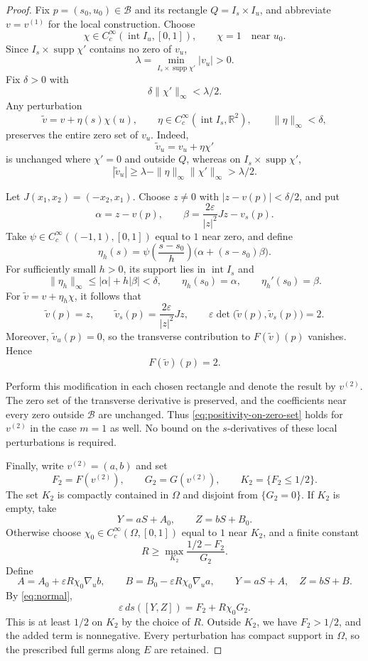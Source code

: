 \documentclass[11pt]{article}
\theoremstyle{remark}
\begin{document}
\begin{proof}
Fix $p=(s_0,u_0)\in\mathcal B$ and its rectangle $Q=I_s\times I_u$, and abbreviate $v=v^{(1)}$ for the local construction. Choose
$$
  \chi\in C_c^\infty(\operatorname{int}I_u,[0,1]),
  \qquad
  \chi=1\quad\text{near }u_0.
$$
Since $I_s\times\operatorname{supp}\chi'$ contains no zero of $v_u$,
$$
  \lambda
  =\min_{I_s\times\operatorname{supp}\chi'}|v_u|
  >0.
$$
Fix $\delta>0$ with
$$
  \delta\|\chi'\|_\infty<\lambda/2.
$$
Any perturbation
$$
  \widetilde v=v+\eta(s)\chi(u),
  \qquad
  \eta\in C_c^\infty(\operatorname{int}I_s,\mathbb R^2),
  \qquad
  \|\eta\|_\infty<\delta,
$$
preserves the entire zero set of $v_u$. Indeed,
$$
  \widetilde v_u=v_u+\eta\chi'
$$
is unchanged where $\chi'=0$ and outside $Q$, whereas on $I_s\times\operatorname{supp}\chi'$,
$$
  |\widetilde v_u|
  \geq\lambda-\|\eta\|_\infty\|\chi'\|_\infty
  >\lambda/2.
$$

Let $J(x_1,x_2)=(-x_2,x_1)$. Choose $z\neq0$ with $|z-v(p)|<\delta/2$, and put
$$
  \alpha=z-v(p),
  \qquad
  \beta=\frac{2\varepsilon}{|z|^2}Jz-v_s(p).
$$
Take $\psi\in C_c^\infty((-1,1),[0,1])$ equal to $1$ near zero, and define
$$
  \eta_h(s)
  =
  \psi\!\left(\frac{s-s_0}{h}\right)
  \bigl(\alpha+(s-s_0)\beta\bigr).
$$
For sufficiently small $h>0$, its support lies in $\operatorname{int}I_s$ and
$$
  \|\eta_h\|_\infty
  \leq|\alpha|+h|\beta|
  <\delta,
  \qquad
  \eta_h(s_0)=\alpha,
  \qquad
  \eta_h'(s_0)=\beta.
$$
For $\widetilde v=v+\eta_h\chi$, it follows that
$$
  \widetilde v(p)=z,
  \qquad
  \widetilde v_s(p)=\frac{2\varepsilon}{|z|^2}Jz,
  \qquad
  \varepsilon\det\bigl(\widetilde v(p),\widetilde v_s(p)\bigr)=2.
$$
Moreover, $\widetilde v_u(p)=0$, so the transverse contribution to $F(\widetilde v)(p)$ vanishes. Hence
$$
  F(\widetilde v)(p)=2.
$$

Perform this modification in each chosen rectangle and denote the result by $v^{(2)}$. The zero set of the transverse derivative is preserved, and the coefficients near every zero outside $\mathcal B$ are unchanged. Thus \eqref{eq:positivity-on-zero-set} holds for $v^{(2)}$ in the case $m=1$ as well. No bound on the $s$-derivatives of these local perturbations is required.

Finally, write $v^{(2)}=(a,b)$ and set
$$
  F_2=F(v^{(2)}),
  \qquad
  G_2=G(v^{(2)}),
  \qquad
  K_2=\{F_2\leq1/2\}.
$$
The set $K_2$ is compactly contained in $\Omega$ and disjoint from $\{G_2=0\}$. If $K_2$ is empty, take
$$
  Y=aS+A_0,\qquad Z=bS+B_0.
$$
Otherwise choose $\chi_0\in C_c^\infty(\Omega,[0,1])$ equal to $1$ near $K_2$, and a finite constant
$$
  R\geq\max_{K_2}\frac{1/2-F_2}{G_2}.
$$
Define
$$
  A=A_0+\varepsilon R\chi_0\nabla_u b,
  \qquad
  B=B_0-\varepsilon R\chi_0\nabla_u a,
  \qquad
  Y=aS+A,\quad Z=bS+B.
$$
By \eqref{eq:normal},
$$
  \varepsilon\,ds([Y,Z])
  =F_2+R\chi_0G_2.
$$
This is at least $1/2$ on $K_2$ by the choice of $R$. Outside $K_2$, we have $F_2>1/2$, and the added term is nonnegative. Every perturbation has compact support in $\Omega$, so the prescribed full germs along $E$ are retained.
\end{proof}
\end{document}
